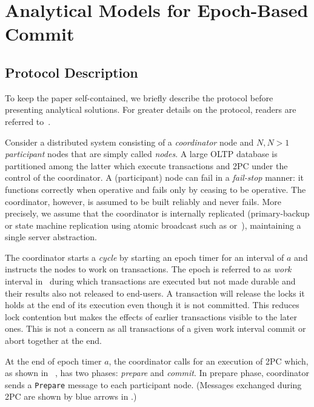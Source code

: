 \section{Analytical Models for Epoch-Based Commit}
\label{sec:epoch-based-commit}

\subsection{Protocol Description}
\label{subsec:ebc-description}

To keep the paper self-contained, we briefly describe the protocol before presenting analytical solutions. 
For greater details on the protocol, readers are referred to~\cite{lu}.

Consider a distributed system consisting of a \emph{coordinator} node and $N, N>1$ \emph{participant} nodes that are simply called \emph{nodes}. A large OLTP database is partitioned among the latter which execute transactions and 2PC under the control of the coordinator. A (participant) node can fail in a \emph{fail-stop} manner: it functions correctly when operative and fails only by ceasing to be operative. The coordinator, however, is assumed to be built reliably and never fails.
More precisely, we assume that the coordinator is internally replicated (primary-backup or state machine replication using atomic broadcast such as \cite{ongaro} or~\cite{lamport}), maintaining a single server abstraction.  

The coordinator starts a \textit{cycle} by starting an epoch timer for an interval of $a$ and instructs the nodes to work on transactions. The epoch is referred to as \emph{work} interval in~ during which transactions are executed but not made durable and their results also not released to end-users. A transaction will release the locks it holds at the end of its execution even though it is not committed. This reduces lock contention but makes the effects of earlier transactions visible to the later ones. This is not a concern as all transactions of a given work interval commit or abort together at the end. 

At the end of epoch timer $a$, the coordinator calls for an execution of 2PC which, as shown in ~, has two phases: \emph{prepare} and \emph{commit}.
In prepare phase, coordinator sends a \texttt{Prepare}
message
to each
participant node. (Messages exchanged during 2PC are shown by blue arrows in  .)

